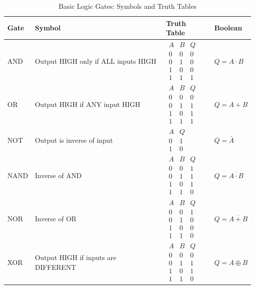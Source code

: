 \begin{table}[H]
\centering
\caption{Basic Logic Gates: Symbols and Truth Tables}
\label{tab:logic_gates}
\begin{tabular}{p{1.5cm}p{3cm}p{4cm}p{3cm}}
\toprule
\textbf{Gate} & \textbf{Symbol} & \textbf{Truth Table}
& \textbf{Boolean}\\
\midrule
AND & Output HIGH only if ALL inputs HIGH &
  $\begin{array}{ccc}A&B&Q\\0&0&0\\0&1&0\\1&0&0\\1&1&1\end{array}$
  & $Q = A \cdot B$\\[0.5cm]
OR & Output HIGH if ANY input HIGH &
  $\begin{array}{ccc}A&B&Q\\0&0&0\\0&1&1\\1&0&1\\1&1&1\end{array}$
  & $Q = A + B$\\[0.5cm]
NOT & Output is inverse of input &
  $\begin{array}{cc}A&Q\\0&1\\1&0\end{array}$
  & $Q = \bar{A}$\\[0.5cm]
NAND & Inverse of AND &
  $\begin{array}{ccc}A&B&Q\\0&0&1\\0&1&1\\1&0&1\\1&1&0\end{array}$
  & $Q = \overline{A \cdot B}$\\[0.5cm]
NOR & Inverse of OR &
  $\begin{array}{ccc}A&B&Q\\0&0&1\\0&1&0\\1&0&0\\1&1&0\end{array}$
  & $Q = \overline{A + B}$\\[0.5cm]
XOR & Output HIGH if inputs are DIFFERENT &
  $\begin{array}{ccc}A&B&Q\\0&0&0\\0&1&1\\1&0&1\\1&1&0\end{array}$
  & $Q = A \oplus B$\\
\bottomrule
\end{tabular}
\end{table}

